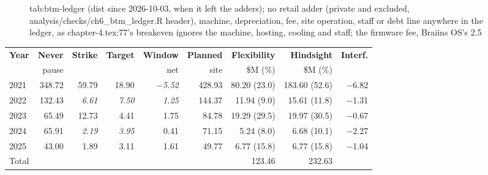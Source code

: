 \begin{figure}[htbp]
tab:btm-ledger (dist since 2026-10-03, when it left the adders); no retail adder (private and excluded, analysis/checks/ch6_btm_ledger.R header), machine, depreciation, fee, site operation, staff or debt line anywhere in the ledger, as chapter-4.tex:77's breakeven ignores the machine, hosting, cooling and staff; the firmware fee, Braiins OS's 2.5%
  \label{fig:stack-shape}
\end{figure}

\begin{table}[tb]
  \centering
  \scriptsize
  \setlength{\tabcolsep}{1.8pt}
  \begin{tabular}{lrrrrrrrr}
    \hline
    \textbf{Year} & \textbf{Never} & \textbf{Strike} & \textbf{Target} & \textbf{Window} & \textbf{Planned} & \textbf{Flexibility} & \textbf{Hindsight} & \textbf{Interf.} \\
     & pause & & & net & site & \$M (\%) & \$M (\%) & \\
    \hline
    2021 & 348.72 & 59.79 & 18.90 & \emph{$-$5.52} & 428.93 & 80.20 (23.0) & 183.60 (52.6) & $-$6.82 \\
    2022 & 132.43 & \emph{6.61} & \emph{7.50} & \emph{1.25} & 144.37 & 11.94 (9.0) & 15.61 (11.8) & $-$1.31 \\
    2023 & 65.49 & 12.73 & 4.41 & 1.75 & 84.78 & 19.29 (29.5) & 19.97 (30.5) & $-$0.67 \\
    2024 & 65.91 & \emph{2.19} & \emph{3.95} & 0.41 & 71.15 & 5.24 (8.0) & 6.68 (10.1) & $-$2.27 \\
    2025 & 43.00 & 1.89 & 3.11 & 1.61 & 49.77 & 6.77 (15.8) & 6.77 (15.8) & $-$1.04 \\
    \hline
    Total & & & & & & 123.46 & 232.63 & \\
    \hline
  \end{tabular}

\end{table}
